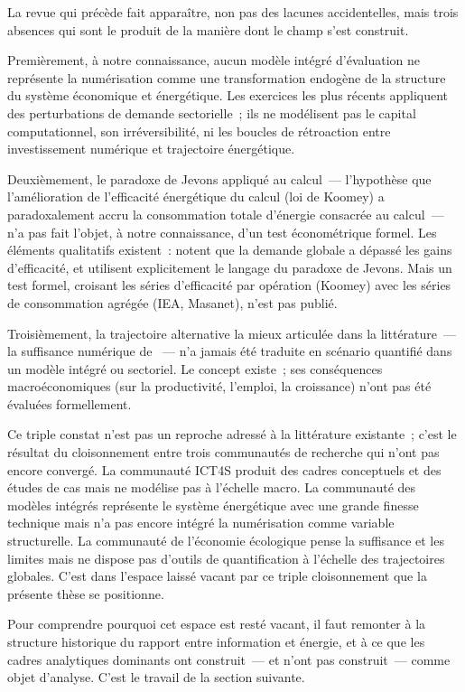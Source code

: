 La revue qui précède fait apparaître, non pas des lacunes accidentelles, mais trois absences qui sont le produit de la manière dont le champ s'est construit.

Premièrement, à notre connaissance, aucun modèle intégré d'évaluation ne représente la numérisation comme une transformation endogène de la structure du système économique et énergétique. Les exercices les plus récents \parencite{wilson_impacts_2026, beath_impacts_2026} appliquent des perturbations de demande sectorielle~; ils ne modélisent pas le capital computationnel, son irréversibilité, ni les boucles de rétroaction entre investissement numérique et trajectoire énergétique.

Deuxièmement, le paradoxe de Jevons appliqué au calcul~--- l'hypothèse que l'amélioration de l'efficacité énergétique du calcul (loi de Koomey) a paradoxalement accru la consommation totale d'énergie consacrée au calcul~--- n'a pas fait l'objet, à notre connaissance, d'un test économétrique formel. Les éléments qualitatifs existent~: \textcite{freitag_real_2021} notent que la demande globale a dépassé les gains d'efficacité, et utilisent explicitement le langage du paradoxe de Jevons. Mais un test formel, croisant les séries d'efficacité par opération (Koomey) avec les séries de consommation agrégée (IEA, Masanet), n'est pas publié.

Troisièmement, la trajectoire alternative la mieux articulée dans la littérature~--- la suffisance numérique de \textcite{santarius_digital_2022}~--- n'a jamais été traduite en scénario quantifié dans un modèle intégré ou sectoriel. Le concept existe~; ses conséquences macroéconomiques (sur la productivité, l'emploi, la croissance) n'ont pas été évaluées formellement.

Ce triple constat n'est pas un reproche adressé à la littérature existante~; c'est le résultat du cloisonnement entre trois communautés de recherche qui n'ont pas encore convergé. La communauté ICT4S produit des cadres conceptuels et des études de cas mais ne modélise pas à l'échelle macro. La communauté des modèles intégrés représente le système énergétique avec une grande finesse technique mais n'a pas encore intégré la numérisation comme variable structurelle. La communauté de l'économie écologique pense la suffisance et les limites mais ne dispose pas d'outils de quantification à l'échelle des trajectoires globales. C'est dans l'espace laissé vacant par ce triple cloisonnement que la présente thèse se positionne.

Pour comprendre pourquoi cet espace est resté vacant, il faut remonter à la structure historique du rapport entre information et énergie, et à ce que les cadres analytiques dominants ont construit~--- et n'ont pas construit~--- comme objet d'analyse. C'est le travail de la section suivante.


